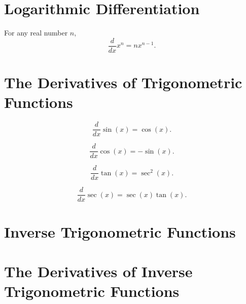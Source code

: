 \documentclass{ximera}
\newcommand{\ddx}{\frac{d}{dx}}
\begin{document}
\section*{Logarithmic Differentiation}





\begin{theorem}
For any real number $n$,
\[
\ddx x^n = n x^{n-1}.
\]
\end{theorem}








\section*{The Derivatives of Trigonometric Functions}





\begin{theorem}\label{theorem:deriv sin}
\[
\ddx \sin(x) = \cos(x).
\]
\end{theorem}



\begin{theorem}
\[
\ddx \cos(x) = -\sin(x).
\]
\end{theorem}



\begin{theorem}
\[
\ddx \tan(x) = \sec^2(x).
\]
\end{theorem}



\begin{theorem}
\[
\ddx \sec(x) = \sec(x)\tan(x).
\]
\end{theorem}






\section*{Inverse Trigonometric Functions}







\section*{The Derivatives of Inverse Trigonometric Functions}
\end{document}
